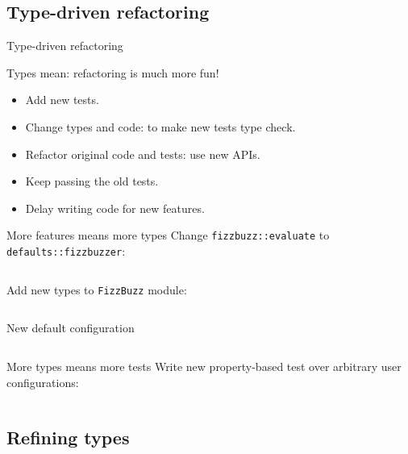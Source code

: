 \subsection{Type-driven refactoring}

\begin{frame}{Type-driven refactoring}
  \begin{block}{Types mean: refactoring is much more fun!}
  \begin{itemize}
  \item Add \alert{new} tests.
  \item Change types and code: to make new tests \alert{type check}.
  \item \alert{Refactor} original code and tests: use new APIs.
  \item Keep passing the \alert{old} tests.
  \item Delay writing code for new features.
  \end{itemize}
  \end{block}
\end{frame}

\begin{frame}[fragile]{More features means more types}
  Change \texttt{fizzbuzz::evaluate} to \texttt{defaults::fizzbuzzer}:
  \inputminted{rust}{Main5.rs}

  Add new types to \texttt{FizzBuzz} module:
  \inputminted{rust}{FizzBuzz3.rs}
\end{frame}

\begin{frame}[fragile]{New default configuration}
  \inputminted{rust}{Defaults1.rs}
\end{frame}

\begin{frame}[fragile]{More types means more tests}
  Write new property-based test over \alert{arbitrary} user configurations:
  \inputminted[gobble=2]{rust}{FizzBuzzSpec6.rs}
\end{frame}

\subsection{Refining types}

